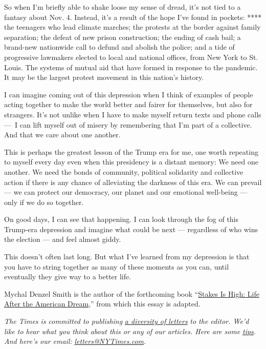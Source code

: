 So when I'm briefly able to shake loose my sense of dread, it's not tied
to a fantasy about Nov. 4. Instead, it's a result of the hope I've found
in pockets: **** the teenagers who lead climate marches; the protests at
the border against family separation; the defeat of new prison
construction; the ending of cash bail; a brand-new nationwide call to
defund and abolish the police; and a tide of progressive lawmakers
elected to local and national offices, from New York to St. Louis. The
systems of mutual aid that have formed in response to the pandemic. It
may be the largest protest movement in this nation's history.

I can imagine coming out of this depression when I think of examples of
people acting together to make the world better and fairer for
themselves, but also for strangers. It's not unlike when I have to make
myself return texts and phone calls ---~I can lift myself out of misery
by remembering that I'm part of a collective. And that we care about one
another.

This is perhaps the greatest lesson of the Trump era for me, one worth
repeating to myself every day even when this presidency is a distant
memory: We need one another. We need the bonds of community, political
solidarity and collective action if there is any chance of alleviating
the darkness of this era. We can prevail --- we can protect our
democracy, our planet and our emotional well-being --- only if we do so
together.

On good days, I can see that happening. I can look through the fog of
this Trump-era depression and imagine what could be next --- regardless
of who wins the election --- and feel almost giddy.

This doesn't often last long. But what I've learned from my depression
is that you have to string together as many of these moments as you can,
until eventually they give way to a better life.

Mychal Denzel Smith is the author of the forthcoming book
``\href{https://www.boldtypebooks.com/titles/mychal-denzel-smith/stakes-is-high/9781568588735/}{Stakes
Is High: Life After the American Dream},'' from which this essay is
adapted.

\emph{The Times is committed to publishing}
\href{https://www.nytimes3xbfgragh.onion/2019/01/31/opinion/letters/letters-to-editor-new-york-times-women.html}{\emph{a
diversity of letters}} \emph{to the editor. We'd like to hear what you
think about this or any of our articles. Here are some}
\href{https://help.nytimes3xbfgragh.onion/hc/en-us/articles/115014925288-How-to-submit-a-letter-to-the-editor}{\emph{tips}}\emph{.
And here's our email:}
\href{mailto:letters@NYTimes.com}{\emph{letters@NYTimes.com}}\emph{.}

